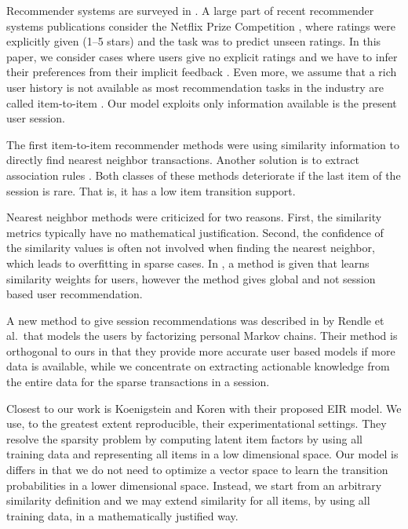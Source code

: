 Recommender systems are surveyed in \cite{ricci2011introduction}.
A large part of recent recommender systems publications consider the Netflix Prize Competition  \cite{bennett2007netflix}, where ratings were explicitly given (1--5 stars) and the task was to predict unseen ratings.
In this paper, we consider cases where users give no explicit ratings and we have to infer their preferences from their implicit feedback \cite{koenigstein2013towards}.
Even more, we assume that a rich user history is not available as most recommendation tasks in the industry are called item-to-item \cite{pilaszy2015neighbor}. Our model exploits only information available is the present user session.

The first item-to-item recommender methods \cite{sarwar01item,amazon-recommender} were using similarity information to directly find nearest neighbor \cite{desrosiers2011comprehensive} transactions. 
Another solution is to extract association rules \cite{davidson2010youtube}.
Both classes of these methods deteriorate if the last item of the session is rare. That is, it has a low item transition support.

Nearest neighbor methods were criticized for two reasons.  First, the similarity metrics typically have no mathematical justification. Second, the confidence of the similarity values is often not involved when finding the nearest neighbor, which leads to overfitting in sparse cases. 
In \cite{koren2010factor}, a method is given that learns similarity weights for users, however the method gives global and not session based user recommendation.

A new method to give session recommendations was described in \cite{rendle2010factorizing} by Rendle et al.\ that models the users by factorizing personal Markov chains.
Their method is orthogonal to ours in that they provide more accurate user based models if more data is available, while we concentrate on extracting actionable knowledge from the entire data for the sparse transactions in a session.

Closest to our work is Koenigstein and Koren \cite{koenigstein2013towards} with their proposed EIR model.
We use, to the greatest extent reproducible, their experimentational settings.
They resolve the sparsity problem by computing latent item factors by using all training data and representing all items in a low dimensional space. Our model is differs in that we do not need to optimize a vector space to learn the transition probabilities in a lower dimensional space. Instead, we start from an arbitrary similarity definition and we may extend similarity for all items, by using all training data, in a mathematically justified way.

